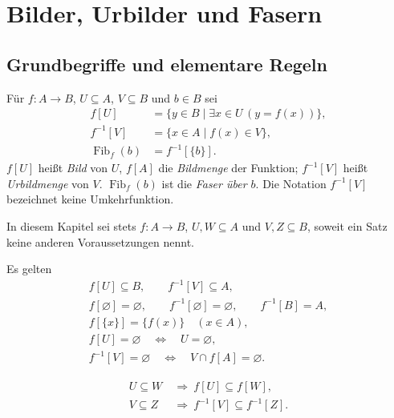 \chapter{Bilder, Urbilder und Fasern}
\label{b05guide:ch:images}

\section{Grundbegriffe und elementare Regeln}

\begin{definition}
\label{b05guide:def:images}
Für $f\colon A\to B$, $U\subseteq A$, $V\subseteq B$ und $b\in B$ sei
\[
 \begin{aligned}
 f[U]&=\{y\in B\mid\exists x\in U\,(y=f(x))\},\\
 f^{-1}[V]&=\{x\in A\mid f(x)\in V\},\\
 \operatorname{Fib}_f(b)&=f^{-1}[\{b\}].
 \end{aligned}
\]
$f[U]$ heißt \emph{Bild} von $U$, $f[A]$ die \emph{Bildmenge}
der Funktion; $f^{-1}[V]$ heißt \emph{Urbildmenge} von $V$.
$\operatorname{Fib}_f(b)$ ist die \emph{Faser über $b$}.
Die Notation $f^{-1}[V]$ bezeichnet keine Umkehrfunktion.
\end{definition}

In diesem Kapitel sei stets $f\colon A\to B$,
$U,W\subseteq A$ und $V,Z\subseteq B$, soweit ein Satz
keine anderen Voraussetzungen nennt.

\begin{theorem}
\label{b05guide:thm:imagebasic}
Es gelten
\[
 \begin{gathered}
 f[U]\subseteq B,\qquad f^{-1}[V]\subseteq A,\\
 f[\varnothing]=\varnothing,\qquad
 f^{-1}[\varnothing]=\varnothing,\qquad f^{-1}[B]=A,\\
 f[\{x\}]=\{f(x)\}\quad(x\in A),\\
 f[U]=\varnothing\quad\Longleftrightarrow\quad U=\varnothing,\\
 f^{-1}[V]=\varnothing\quad\Longleftrightarrow\quad V\cap f[A]=\varnothing.
 \end{gathered}
\]
\end{theorem}

\begin{theorem}
\[
 \begin{aligned}
 U\subseteq W&\ \Longrightarrow\ f[U]\subseteq f[W],\\
 V\subseteq Z&\ \Longrightarrow\ f^{-1}[V]\subseteq f^{-1}[Z].
 \end{aligned}
\]
\end{theorem}

